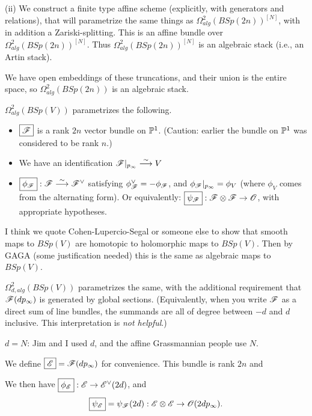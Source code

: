 {(ii) 
We construct a finite type affine scheme (explicitly, with generators and relations), that will parametrize the same things as  $\Omega^2_{alg}(BSp(2n))^{[N]}$, with in addition a Zariski-splitting.  This is an affine bundle  over $\Omega^2_{alg}(BSp(2n))^{[N]}$.  Thus $\Omega^2_{alg}(BSp(2n))^{[N]}$ is an algebraic stack (i.e., an Artin stack).

We  have open embeddings of these truncations, and their union is  the entire space, so $\Omega^2_{alg}(BSp(2n))$ is an algebraic stack.




$\Omega^2_{alg}(B Sp(V))$ parametrizes the following.

\begin{itemize}
\item $\boxed{{\mathscr{F}}}$ is a rank $2n$ vector bundle on $\mathbb P^1$.  (Caution:  earlier the bundle on $\mathbb P^1$ was considered to be rank $n$.)
\item  We have an identification ${\mathscr{F}}|_{p_{\infty}} \overset \sim \longrightarrow V$
\item $\boxed{\phi_{\mathscr{F}}}: {\mathscr{F}} \overset \sim \longrightarrow {\mathscr{F}}^\vee$ satisfying 
$\phi^\vee_{\mathscr{F}} = -\phi_{\mathscr{F}}$, and $\phi_{{\mathscr{F}}}|_{p_\infty} = \phi_V$ (where $\phi_V$ comes
from the alternating form).    Or equivalently:  $\boxed{\psi_{{\mathscr{F}}}}: {\mathscr{F}}\otimes {\mathscr{F}} \rightarrow {\mathscr{O}}$,
with appropriate hypotheses.
\end{itemize}


I think we quote Cohen-Lupercio-Segal or someone else to show that smooth maps to $BSp(V)$ are homotopic to holomorphic maps to $BSp(V)$.
Then by GAGA (some justification needed) this is the same as algebraic maps to $BSp(V)$.

\point $\boxed{\Omega^2_{d,alg}(B Sp(V))}$ parametrizes the same, with the additional requirement that ${\mathscr{F}}(d p_\infty)$ is
generated by global sections.  (Equivalently, when you write ${\mathscr{F}}$ as a direct sum of line bundles, the summands
are all of degree between $-d$ and $d$ inclusive.  This interpretation is {\em not helpful}.)

$\boxed{d=N}$:  Jim and I used $d$, and the affine Grassmannian people use $N$. 

We define $\boxed{{\mathscr{E}}} = {\mathscr{F}} (d p_{\infty})$ for convenience.  This bundle is rank $2n$ and 

We then have $\boxed{\phi_{{\mathscr{E}}}} : {\mathscr{E}} \rightarrow {\mathscr{E}}^\vee(2d)$, and \begin{equation}
  \boxed{\psi_{{\mathscr{E}}}} = \psi_{{\mathscr{F}}}(2d) : {\mathscr{E}} \otimes {\mathscr{E}} \rightarrow {\mathscr{O}}(2d p_{\infty}).
  \label{eq:p20}
  \end{equation}

}
